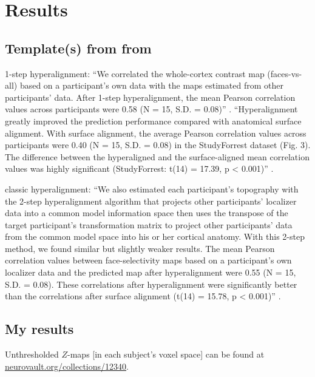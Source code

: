 \section{Results}


\subsection{Template(s) from from \citet{jiahui2020predicting}}

1-step hyperalignment: ``We correlated the whole-cortex contrast map
(faces-vs-all) based on a participant's own data with the maps estimated from
other participants' data.  After 1-step hyperalignment, the mean Pearson
correlation values across participants were 0.58 (N = 15, S.D. = 0.08)''
\citep{jiahui2020predicting}.
%
``Hyperalignment greatly improved the prediction performance compared with
anatomical surface alignment. With surface alignment, the average Pearson
correlation values across participants were 0.40 (N = 15, S.D. = 0.08) in the
StudyForrest dataset (Fig. 3). The difference between the hyperaligned and the
surface-aligned mean correlation values was highly significant (StudyForrest:
t(14) = 17.39, p < 0.001)'' \citep{jiahui2020predicting}.

%
classic hyperalignment: ``We also estimated each participant's topography with
the 2-step hyperalignment algorithm that projects other participants' localizer
data into a common model information space then uses the transpose of the target
participant's transformation matrix to project other participants' data from the
common model space into his or her cortical anatomy. With this 2-step method, we
found similar but slightly weaker results. The mean Pearson correlation values
between face-selectivity maps based on a participant's own localizer data and
the predicted map after hyperalignment were 0.55 (N = 15, S.D. = 0.08).  These
correlations after hyperalignment were significantly better than the
correlations after surface alignment (t(14) = 15.78, p < 0.001)''
\citep{jiahui2020predicting}.


\subsection{My results}

Unthresholded $Z$-maps [in each subject's voxel space] can be found at
\href{https://identifiers.org/neurovault.collection:12340}{\url{neurovault.org/collections/12340}}.


